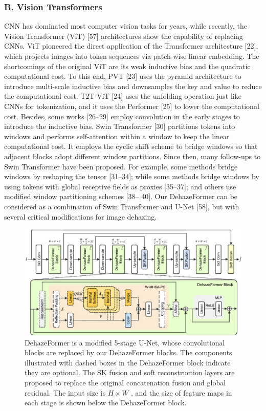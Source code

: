 \subsubsection{B. Vision Transformers}

CNN has dominated most computer vision tasks for years, while recently, the Vision Transformer (ViT) [57] architectures show the capability of replacing CNNs. ViT pioneered the direct application of the Transformer architecture [22], which projects images into token sequences via patch-wise linear embedding. The shortcomings of the original ViT are its weak inductive bias and the quadratic computational cost. To this end, PVT [23] uses the pyramid architecture to introduce multi-scale inductive bias and downsamples the key and value to reduce the computational cost. T2T-ViT [24] uses the unfolding operation just like CNNs for tokenization, and it uses the Performer [25] to lower the computational cost. Besides, some works [26–29] employ convolution in the early stages to introduce the inductive bias. Swin Transformer [30] partitions tokens into windows and performs self-attention within a window to keep the linear computational cost. It employs the cyclic shift scheme to bridge windows so that adjacent blocks adopt different window partitions. Since then, many follow-ups to Swin Transformer have been proposed. For example, some methods bridge windows by reshaping the tensor [31–34]; while some methods bridge windows by using tokens with global receptive fields as proxies [35–37]; and others use modified window partitioning schemes [38– 40]. Our DehazeFormer can be considered as a combination of Swin Transformer and U-Net [58], but with several critical modifications for image dehazing.

\begin{figure}[htbp]
\centering
\includegraphics[width=0.8\linewidth]{images/4b0b6333b8eaad02b7dd86def1849e8d4ff72f8a2d513cf4bf6de7e59cc94e8f.jpg}
\caption{DehazeFormer is a modified 5-stage U-Net, whose convolutional blocks are replaced by our DehazeFormer blocks. The components illustrated with dashed boxes in the DehazeFormer block indicate they are optional. The SK fusion and soft reconstruction layers are proposed to replace the original concatenation fusion and global residual. The input size is $H\times W$ , and the size of feature maps in each stage is shown below the DehazeFormer block.}
\label{fig:2}
\end{figure}


